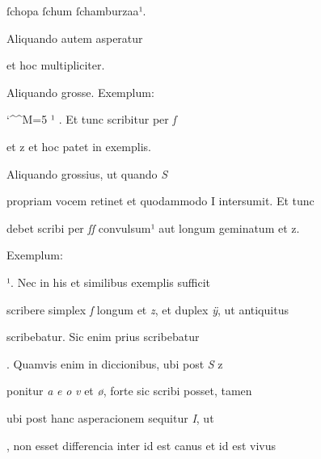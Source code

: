 ſchopa ſchum ſchamburzaa¹.

\indentK Aliquando autem asperatur

\splitlines

et hoc multipliciter.

\indentK Aliquando grosse. Exemplum:  

\fulllines

\catcode `\^^M=5
\obeylines
{}  ¹ . Et tunc scribitur per \textit{ſ} 

\splitlines

 et z et hoc patet in exemplis.

Aliquando grossius, ut quando \textit{S}

\fulllines

propriam vocem retinet et quodammodo I intersumit. Et tunc 

debet scribi per \textit{ſſ} convulsum¹ aut longum geminatum et z. 


Exemplum:      

 ¹. Nec in his et similibus exemplis sufficit 


scribere simplex \textit{ſ} longum et \textit{z}, et duplex \textit{ÿ}, ut antiquitus 

scribebatur. Sic enim prius scribebatur  

. Quamvis enim in diccionibus, ubi post \textit{S} z 


ponitur \textit{a} \textit{e} \textit{o} \textit{v} et \textit{ø}, forte sic scribi posset, tamen 

ubi post hanc asperacionem sequitur \textit{I}, ut  

, non esset differencia inter  id est canus et  id est vivus 

